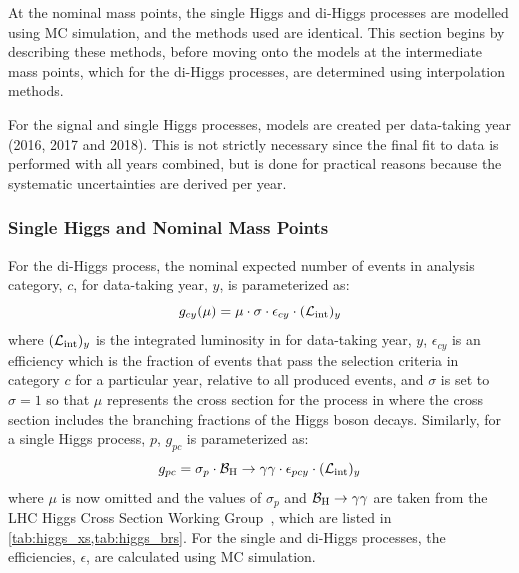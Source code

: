 At the nominal mass points, the single Higgs and di-Higgs processes are modelled using MC simulation, and the methods used are identical. This section begins by describing these methods, before moving onto the models at the intermediate mass points, which for the di-Higgs processes, are determined using interpolation methods.

For the signal and single Higgs processes, models are created per data-taking year (2016, 2017 and 2018). This is not strictly necessary since the final fit to data is performed with all years combined, but is done for practical reasons because the systematic uncertainties are derived per year. 

\subsubsection{Single Higgs and Nominal Mass Points}\label{sec:single_dihiggs_modelling}
For the di-Higgs process, the nominal expected number of events in analysis category, $c$, for data-taking year, $y$, is parameterized as:
\begin{equation}
  g_{cy}(\mu) = \mu \cdot \sigma \cdot \epsilon_{cy} \cdot (\mathcal{L}_\text{int})_y
\end{equation}
where $(\mathcal{L}_\text{int})_y$ is the integrated luminosity in \fbinv for data-taking year, $y$, $\epsilon_{cy}$ is an efficiency which is the fraction of events that pass the selection criteria in category $c$ for a particular year, relative to all produced events, and $\sigma$ is set to $\sigma=1$ so that $\mu$ represents the cross section for the process in \fb where the cross section includes the branching fractions of the Higgs boson decays. Similarly, for a single Higgs process, $p$, $g_{pc}$ is parameterized as:
\begin{equation}
  g_{pc} = \sigma_p \cdot \mathcal{B}_\mathrm{H} \to \gamma\gamma \cdot \epsilon_{pcy} \cdot (\mathcal{L}_\text{int})_y
\end{equation}
where $\mu$ is now omitted and the values of $\sigma_p$ and $\mathcal{B}_\mathrm{H} \to \gamma\gamma$ are taken from the LHC Higgs Cross Section Working Group~\cite{LHCHiggsCrossSectionWorkingGroup:2016ypw}, which are listed in \cref{tab:higgs_xs,tab:higgs_brs}. For the single and di-Higgs processes, the efficiencies, $\epsilon$, are calculated using MC simulation.

